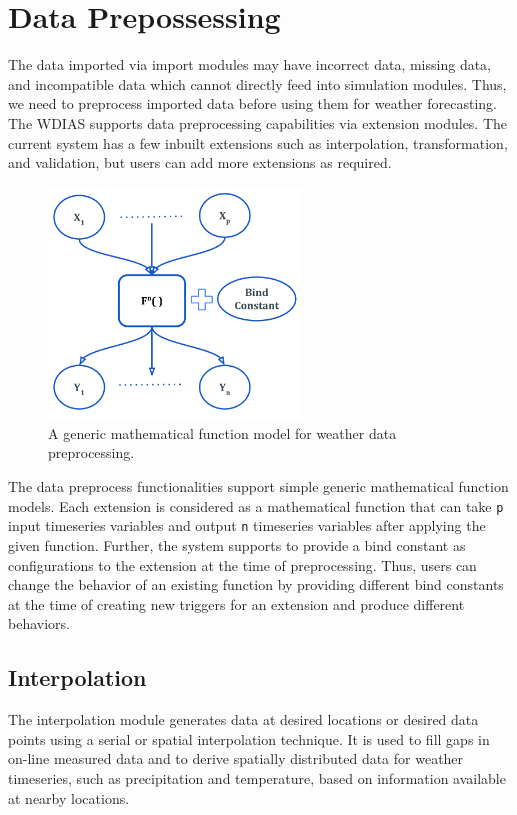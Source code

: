 \section{Data Prepossessing}
\label{se:data_preprocess}

The data imported via import modules may have incorrect data, missing data, and incompatible data which cannot directly feed into simulation modules.
Thus, we need to preprocess imported data before using them for weather forecasting. The WDIAS supports data preprocessing capabilities via extension modules. The current system has a few inbuilt extensions such as interpolation, transformation, and validation, but users can add more extensions as required.

\begin{figure}[htp]
    \centering
    \includegraphics[width=0.6\textwidth]{method/data_preprocess/weather_data_preprocessing.pdf}
    \caption{A generic mathematical function model for weather data preprocessing.}
    \label{fi:weather_data_preprocessing}
\end{figure}

The data preprocess functionalities support simple generic mathematical function models. Each extension is considered as a mathematical function that can take \texttt{p} input timeseries variables and output \texttt{n} timeseries variables after applying the given function. Further, the system supports to provide a bind constant as configurations to the extension at the time of preprocessing. Thus, users can change the behavior of an existing function by providing different bind constants at the time of creating new triggers for an extension and produce different behaviors.

\subsection{Interpolation}
The interpolation module generates data at desired locations or desired data points using a serial or spatial interpolation technique. It is used to fill gaps in on-line measured data and to derive spatially distributed data for weather timeseries, such as precipitation and temperature, based on information available at nearby locations.

